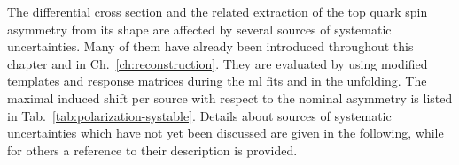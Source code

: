 The differential cross section and the related extraction of the top quark spin asymmetry from its shape are affected by several sources of systematic uncertainties. Many of them have already been introduced throughout this chapter and in Ch.~\ref{ch:reconstruction}. They are evaluated by using modified templates and response matrices during the \gls{ml} fits and in the unfolding. The maximal induced shift per source with respect to the nominal asymmetry is listed in Tab.~\ref{tab:polarization-systable}. Details about sources of systematic uncertainties which have not yet been discussed are given in the following, while for others a reference to their description is provided.

